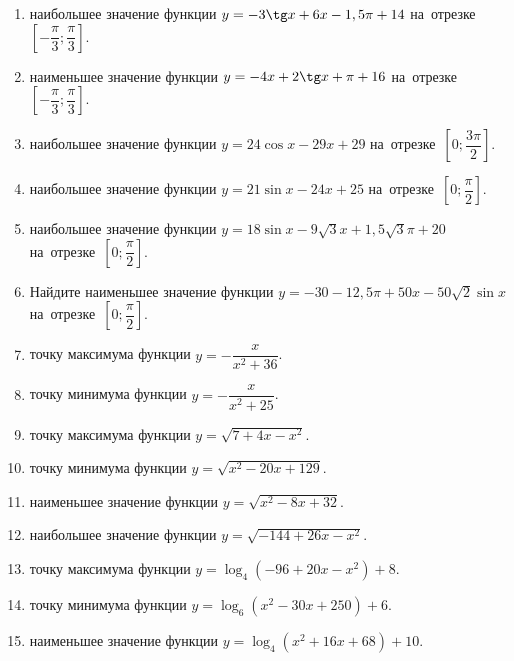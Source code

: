 \documentclass[a4paper,10pt]{article}
\begin{document}
\begin{enumerate}
\item {} наибольшее значение функции $y=-3\tg x +6x-1,5\pi +14$ на~отрезке~$\left[-\dfrac{\pi}{3};\dfrac{\pi}{3}\right]$.

\item {} наименьшее значение функции $y=-4x +2\tg x+\pi+16$ на~отрезке~$\left[-\dfrac{\pi}{3};\dfrac{\pi}{3}\right]$.

\item {} наибольшее значение функции $y=24\cos x-29x+29$ на~отрезке~$\left[0;\dfrac{3\pi}{2}\right]$.

\item {} наибольшее значение функции $y=21\sin x-24x+25$ на~отрезке~$\left[0;\dfrac{\pi}{2}\right]$.

\item {} наибольшее значение функции $y=18\sin x-9\sqrt{3}x+1,5\sqrt{3}\pi +20$ на~отрезке~$\left[0;\dfrac{\pi}{2}\right]$.

\item Найдите наименьшее значение функции $y=-30-12,5\pi+50x-50\sqrt{2}\sin x$ на~отрезке~$\left[0;\dfrac{\pi}{2}\right]$.

\item {} точку максимума функции $y=-\dfrac{x}{ x^2 +36}$.

\item {} точку минимума функции $y=-\dfrac{x}{ x^2 +25}$.

\item {} точку максимума функции $y=\sqrt{7+4x-x^2}$.

\item {} точку минимума функции $y=\sqrt{x^2-20x+129}$.

\item {} наименьшее значение функции $y=\sqrt{x^2-8x+32}$.

\item {} наибольшее значение функции $y=\sqrt{-144+26x-x^2}$.

\item {} точку максимума функции $y=\log_4\left(-96+20x-x^2\right)+8$.

\item {} точку минимума функции $y=\log_6\left(x^2-30x+250\right)+6$.

\item {} наименьшее значение функции $y=\log_4\left(x^2+16x+68\right)+10$.


\end{enumerate}
\end{document}
